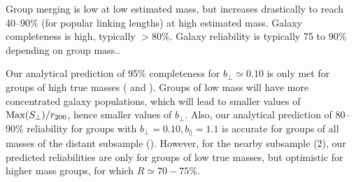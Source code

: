 Group merging is low at low estimated mass, but increases drastically to reach
40--90\% (for popular linking lengths) at high estimated mass. Galaxy
completeness is high, typically $>80\%$. Galaxy reliability is typically 75 to
90\% depending on group mass..

Our analytical prediction of 95\% completeness for $b_\perp\simeq 0.10$ is only
met for groups of high true masses ( and
). Groups of low mass will have more concentrated
galaxy populations, which will lead to smaller values of ${\rm
Max}(S_\perp)/r_{200}$, hence smaller values of $b_\perp$. Also, our analytical
prediction of 80--90\% reliability for groups with $b_\perp=0.10,
b_\parallel=1.1$ is accurate for groups of all masses of the distant subsample
(). However, for the nearby subsample (2), our
predicted reliabilities are only  for groups of low true
masses, but optimistic for higher mass groups, for which $R \simeq 70-75\%$.

